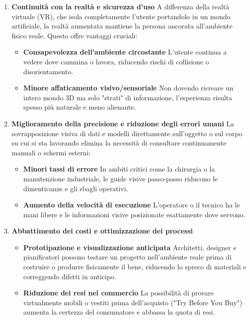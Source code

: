 \begin{enumerate}
    \item \textbf{Continuità con la realtà e sicurezza d'uso} \newline
    A differenza della realtà virtuale (VR), che isola completamente l'utente portandolo in un mondo artificiale, la realtà aumentata mantiene la persona ancorata all'ambiente fisico reale. Questo offre vantaggi cruciali:
    \begin{itemize}
        \item \textbf{Consapevolezza dell'ambiente circostante} \newline
        L'utente continua a vedere dove cammina o lavora, riducendo rischi di collisione o disorientamento.
        \item \textbf{Minore affaticamento visivo/sensoriale} \newline
        Non dovendo ricreare un intero mondo 3D ma solo "strati" di informazione, l'esperienza risulta spesso più naturale e meno alienante.
    \end{itemize}

    \item \textbf{Miglioramento della precisione e riduzione degli errori umani} \newline
    La sovrapposizione visiva di dati e modelli direttamente sull'oggetto o sul corpo su cui si sta lavorando elimina la necessità di consultare continuamente manuali o schermi esterni:
    \begin{itemize}
        \item \textbf{Minori tassi di errore} \newline
        In ambiti critici come la chirurgia o la manutenzione industriale, le guide visive passo-passo riducono le dimenticanze e gli sbagli operativi.
        \item \textbf{Aumento della velocità di esecuzione} \newline
        L'operatore o il tecnico ha le mani libere e le informazioni visive posizionate esattamente dove servono.
    \end{itemize}

    \item \textbf{Abbattimento dei costi e ottimizzazione dei processi} \newline
    \begin{itemize}
        \item \textbf{Prototipazione e visualizzazione anticipata} \newline
        Architetti, designer e pianificatori possono testare un progetto nell'ambiente reale prima di costruire o produrre fisicamente il bene, riducendo lo spreco di materiali e correggendo difetti in anticipo.
        \item \textbf{Riduzione dei resi nel commercio} \newline
        La possibilità di provare virtualmente mobili o vestiti prima dell'acquisto ("Try Before You Buy") aumenta la certezza del consumatore e abbassa la quota di resi.
    \end{itemize}


\end{enumerate}
